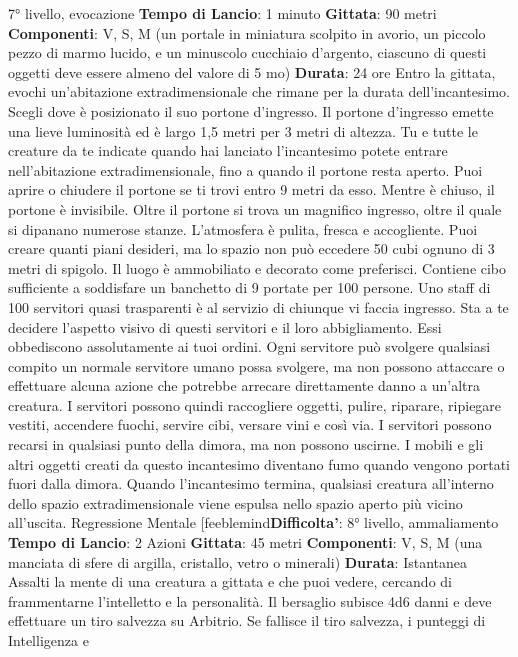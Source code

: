 \begin{multicols}{2}
7° livello, evocazione
\textbf{Tempo di Lancio}: 1 minuto
\textbf{Gittata}: 90 metri
\textbf{Componenti}: V, S, M (un portale in miniatura scolpito
in avorio, un piccolo pezzo di marmo lucido, e un
minuscolo cucchiaio d’argento, ciascuno di questi
oggetti deve essere almeno del valore di 5 mo)
\textbf{Durata}: 24 ore
Entro la gittata, evochi un’abitazione extradimensionale
che rimane per la durata dell’incantesimo. Scegli dove è
posizionato il suo portone d’ingresso. Il portone
d’ingresso emette una lieve luminosità ed è largo 1,5
metri per 3 metri di altezza. Tu e tutte le creature da te
indicate quando hai lanciato l’incantesimo potete
entrare nell’abitazione extradimensionale, fino a quando
il portone resta aperto. Puoi aprire o chiudere il portone
se ti trovi entro 9 metri da esso. Mentre è chiuso, il
portone è invisibile.
Oltre il portone si trova un magnifico ingresso, oltre il
quale si dipanano numerose stanze. L’atmosfera è
pulita, fresca e accogliente.
Puoi creare quanti piani desideri, ma lo spazio non può
eccedere 50 cubi ognuno di 3 metri di spigolo. Il luogo è
ammobiliato e decorato come preferisci. Contiene cibo
sufficiente a soddisfare un banchetto di 9 portate per
100 persone. Uno staff di 100 servitori quasi trasparenti
è al servizio di chiunque vi faccia ingresso. Sta a te
decidere l’aspetto visivo di questi servitori e il loro
abbigliamento. Essi obbediscono assolutamente ai tuoi
ordini. Ogni servitore può svolgere qualsiasi compito un
normale servitore umano possa svolgere, ma non
possono attaccare o effettuare alcuna azione che
potrebbe arrecare direttamente danno a un’altra
creatura. I servitori possono quindi raccogliere oggetti,
pulire, riparare, ripiegare vestiti, accendere fuochi,
servire cibi, versare vini e così via. I servitori possono
recarsi in qualsiasi punto della dimora, ma non possono
uscirne. I mobili e gli altri oggetti creati da questo
incantesimo diventano fumo quando vengono portati
fuori dalla dimora. Quando l’incantesimo termina,
qualsiasi creatura all’interno dello spazio
extradimensionale viene espulsa nello spazio aperto più
vicino all’uscita.
Regressione Mentale
[feeblemind\textbf{Difficolta'}:
8° livello, ammaliamento
\textbf{Tempo di Lancio}: 2 Azioni
\textbf{Gittata}: 45 metri
\textbf{Componenti}: V, S, M (una manciata di sfere di argilla,
cristallo, vetro o minerali)
\textbf{Durata}: Istantanea
Assalti la mente di una creatura a gittata e che puoi
vedere, cercando di frammentarne l’intelletto e la
personalità. Il bersaglio subisce 4d6 danni e
deve effettuare un tiro salvezza su Arbitrio.
Se fallisce il tiro salvezza, i punteggi di Intelligenza e

\end{multicols}
